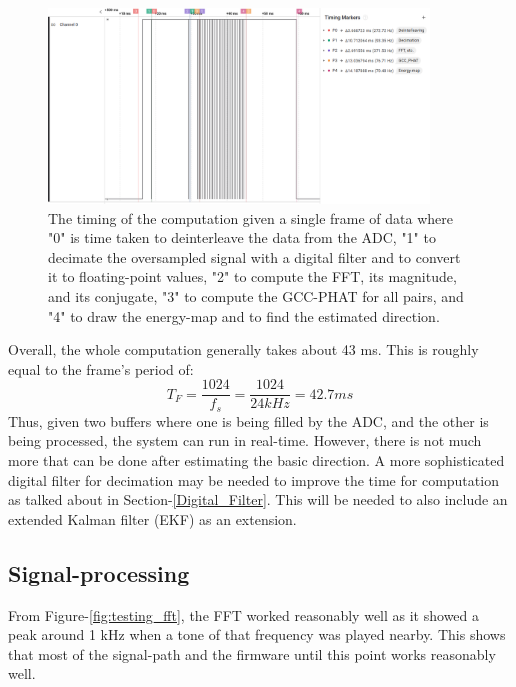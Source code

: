 \documentclass[notitlepage]{report}
\begin{document}
\begin{figure}[H]
\includegraphics[width=0.9\textwidth]{./results_timing.png}
\centering
\caption{The timing of the computation given a single frame of data where "0" is time taken to deinterleave the data from the ADC, "1" to decimate the oversampled signal with a digital filter and to convert it to floating-point values, "2" to compute the FFT, its magnitude, and its conjugate, "3" to compute the GCC-PHAT for all pairs, and "4" to draw the energy-map and to find the estimated direction.}
\label{fig:testing_timing}
\centering
\end{figure}

Overall, the whole computation generally takes about 43 \si{ms}. This is roughly equal to the frame's period of:
\begin{equation}
T_F = \frac{1024}{f_s} = \frac{1024}{24 \si{kHz}} = 42.7 \si{ms}
\end{equation}
Thus, given two buffers where one is being filled by the ADC, and the other is being processed, the system can run in real-time. However, there is not much more that can be done after estimating the basic direction. A more sophisticated digital filter for decimation may be needed to improve the time for computation as talked about in Section-\ref{Digital_Filter}. This will be needed to also include an extended Kalman filter (EKF) as an extension.

\subsection{Signal-processing}

From Figure-\ref{fig:testing_fft}, the FFT worked reasonably well as it showed a peak around 1 \si{kHz} when a tone of that frequency was played nearby. This shows that most of the signal-path and the firmware until this point works reasonably well.
\end{document}
